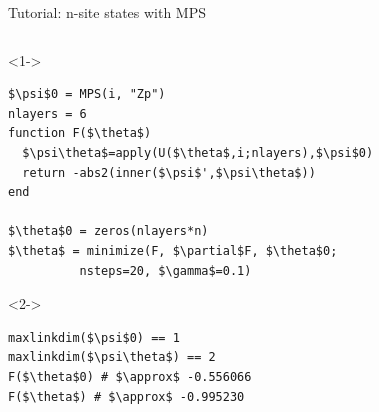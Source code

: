 \begin{frame}[fragile]{Tutorial: n-site states with MPS}

\begin{columns}

\begin{column}{5.5cm}

\begin{onlyenv}<1->
\begin{lstlisting}[language=JuliaLocal, style=julia, mathescape, basicstyle=\scriptsize\ttfamily]
$\psi$0 = MPS(i, "Zp")
nlayers = 6
function F($\theta$)
  $\psi\theta$=apply(U($\theta$,i;nlayers),$\psi$0)
  return -abs2(inner($\psi$',$\psi\theta$))
end

$\theta$0 = zeros(nlayers*n)
$\theta$ = minimize(F, $\partial$F, $\theta$0;
          nsteps=20, $\gamma$=0.1)
\end{lstlisting}
\end{onlyenv}


\begin{onlyenv}<2->
\begin{lstlisting}[language=JuliaLocal, style=julia, mathescape, basicstyle=\scriptsize\ttfamily]
maxlinkdim($\psi$0) == 1
maxlinkdim($\psi\theta$) == 2
F($\theta$0) # $\approx$ -0.556066
F($\theta$) # $\approx$ -0.995230
\end{lstlisting}
\end{onlyenv}

\end{column}

\begin{column}{4.5cm}



\end{column}
\end{columns}
\end{frame}
